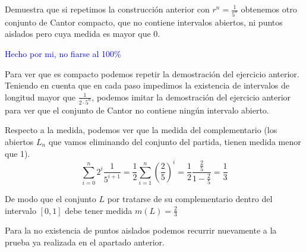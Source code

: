 \begin{problem}[16]
Demuestra que si repetimos la construcción anterior con $r^n=\frac{1}{5^n}$ obtenemos otro conjunto de Cantor compacto, que no contiene intervalos abiertos, ni puntos aislados pero cuya medida es mayor que 0.

\solution

\textcolor{blue}{Hecho por mi, no fiarse al 100\%}

Para ver que es compacto podemos repetir la demostración del ejercicio anterior. Teniendo en cuenta que en cada paso impedimos la existencia de intervalos de longitud mayor que $\frac{1}{2\cdot 5^n}$, podemos imitar la demostración del ejercicio anterior para ver que el conjunto de Cantor no contiene ningún intervalo abierto.

Respecto a la medida, podemos ver que la medida del complementario (los abiertos $L_n$ que vamos eliminando del conjunto del partida, tienen medida menor que 1).
\[\sum_{i=0}^{n}2^i\frac{1}{5^{i+1}} = \frac{1}{2}\sum_{i=1}^{n}\left(\frac{2}{5}\right)^i = \frac{1}{2}\frac{\frac{2}{5}}{1-\frac{2}{5}} = \frac{1}{3}\]

De modo que el conjunto $L$ por tratarse de su complementario dentro del intervalo $[0,1]$ debe tener medida $m(L)=\frac{2}{3}$

Para la no existencia de puntos aislados podemos recurrir nuevamente a la prueba ya realizada en el apartado anterior.
\end{problem}

